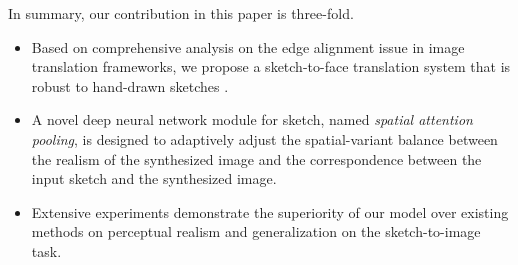 In summary, our contribution in this paper is three-fold.
\begin{itemize}
	\item Based on comprehensive analysis on the edge alignment issue in image translation frameworks, we propose a sketch-to-face translation system that is robust to hand-drawn sketches . 
	\item A novel deep neural network module for sketch, named \emph{spatial attention pooling}, is designed to adaptively adjust the spatial-variant balance between the realism of the synthesized image and the correspondence between the input sketch and the synthesized image.
	\item Extensive experiments demonstrate the superiority of our model over existing methods on perceptual realism and generalization on the sketch-to-image task.
\end{itemize}